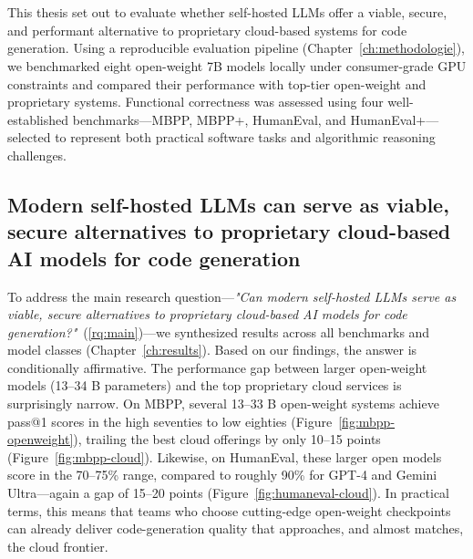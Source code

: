 
\chapter{}%
\label{ch:conclusie}


This thesis set out to evaluate whether self-hosted \glspl{LLM} offer a viable, secure, and performant alternative to proprietary cloud-based systems for code generation. Using a reproducible evaluation pipeline (Chapter~\ref{ch:methodologie}), we benchmarked eight open-weight 7B models locally under consumer-grade GPU constraints and compared their performance with top-tier open-weight and proprietary systems. Functional correctness was assessed using four well-established benchmarks—MBPP, MBPP+, HumanEval, and HumanEval+—selected to represent both practical software tasks and algorithmic reasoning challenges.

\section{Modern self-hosted LLMs can serve as viable, secure alternatives to proprietary cloud-based AI models for code generation}

To address the main research question—\textit{"Can modern self-hosted LLMs serve as viable, secure alternatives to proprietary cloud-based AI models for code generation?"}~(\ref{rq:main})—we synthesized results across all benchmarks and model classes (Chapter~\ref{ch:results}). Based on our findings, the answer is conditionally affirmative. The performance gap between larger open-weight models (13–34 B parameters) and the top proprietary cloud services is surprisingly narrow. On MBPP, several 13–33 B open-weight systems achieve pass@1 scores in the high seventies to low eighties (Figure~\ref{fig:mbpp-openweight}), trailing the best cloud offerings by only 10–15 points (Figure~\ref{fig:mbpp-cloud}). Likewise, on HumanEval, these larger open models score in the 70–75\% range, compared to roughly 90\% for GPT-4 and Gemini Ultra—again a gap of 15–20 points (Figure~\ref{fig:humaneval-cloud}). In practical terms, this means that teams who choose cutting-edge open-weight checkpoints can already deliver code-generation quality that approaches, and almost matches, the cloud frontier.

